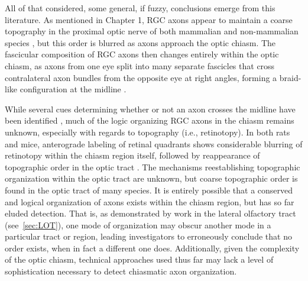 All of that considered, some general, if fuzzy, conclusions emerge from this literature.
As mentioned in Chapter 1, RGC axons appear to maintain a coarse topography in the proximal optic nerve of both mammalian \cite{chan1999changes,plas2005pretarget,chan1994changes,simon1991relationship,reese1993reestablishment,horton1979non,naito1986course,naito1994retinogeniculate} and non-mammalian species \cite{montgomery1998organization,ehrlich1984course}, but this order is blurred as axons approach the optic chiasm.
The fascicular composition of RGC axons then changes entirely within the optic chiasm, as axons from one eye split into many separate fascicles that cross contralateral axon bundles from the opposite eye at right angles, forming a braid-like configuration at the midline \cite{colello1998changing}.

While several cues determining whether or not an axon crosses the midline have been identified \cite{erskine2014connecting}, much of the logic organizing RGC axons in the chiasm remains unknown, especially with regards to topography (i.e., retinotopy).
In both rats and mice, anterograde labeling of retinal quadrants shows considerable blurring of retinotopy within the chiasm region itself, followed by reappearance of topographic order in the optic tract \cite{chan1994changes,chan1999changes}.
The mechanisms reestablishing topographic organization within the optic tract are unknown, but coarse topographic order is found in the optic tract of many species.
It is entirely possible that a conserved and logical organization of axons exists within the chiasm region, but has so far eluded detection.
That is, as demonstrated by work in the lateral olfactory tract (see~\ref{sec:LOT}), one mode of organization may obscur another mode in a particular tract or region, leading investigators to erroneously conclude that no order exists, when in fact a different one does.
Additionally, given the complexity of the optic chiasm, technical approaches used thus far may lack a level of sophistication necessary to detect chiasmatic axon organization.

